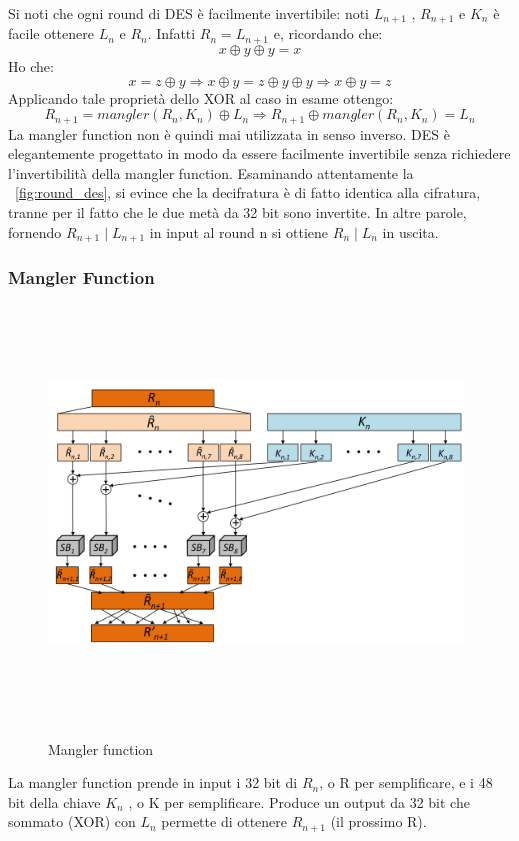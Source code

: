 Si noti che ogni round di DES è facilmente invertibile: noti $L_{n+1}$ , $R_{n+1}$ e $K_{n}$ è facile ottenere $L_{n}$ e $R_{n}$. Infatti $R_{n} = L_{n+1}$ e, ricordando che:
\[
x \oplus y \oplus y = x
\]
Ho che:
\[
x  = z \oplus y \Rightarrow  x \oplus y = z \oplus y \oplus y \Rightarrow  x \oplus y = z
\]
Applicando tale proprietà dello XOR al caso in esame ottengo:
\begin{equation}
R_{n+1} = mangler(R_{n}, K_{n}) \oplus L_{n} \Rightarrow R_{n+1} \oplus mangler(R_{n}, K_{n}) = L_{n}
\end{equation}
La mangler function non è quindi mai utilizzata in senso inverso. DES è elegantemente progettato in modo da essere facilmente invertibile senza richiedere l'invertibilità della mangler function. Esaminando attentamente la \figurename ~\ref{fig:round_des}, si evince che la decifratura è di fatto identica alla cifratura, tranne per il fatto che le due metà da 32 bit sono invertite. In altre parole, fornendo $R_{n+1} \mid L_{n+1}$ in input al round n si ottiene $R_{n} \mid L_{n}$ in uscita.

\subsubsection{Mangler Function}
\begin{figure}[htbp]
	\centering%
	\subfigure%
	{\includegraphics[height=11cm, width=11cm, keepaspectratio]{Immagini/chiave_segreta/mangler.png}}
	\caption{Mangler function \label{fig:mangler}} 	
\end{figure}
La mangler function prende in input i 32 bit di $R_{n}$, o R per semplificare, e i 48 bit della chiave $K_{n}$ , o K per semplificare. Produce un output da 32 bit che sommato (XOR) con $L_{n}$ permette di ottenere $R_{n+1}$ (il prossimo R).\newline

